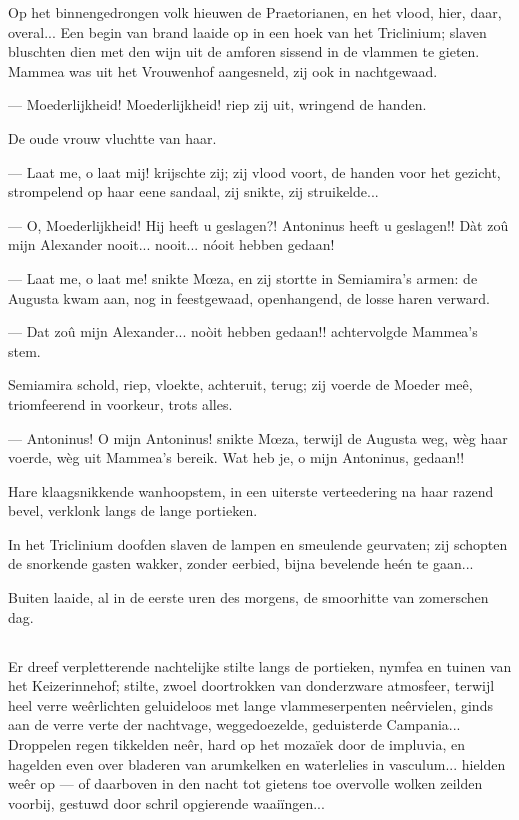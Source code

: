 \documentclass[a4paper, 12pt, oneside, dutch]{article}
\begin{document}
Op het binnengedrongen volk hieuwen de Praetorianen, en het vlood, hier, daar, overal... Een begin van brand laaide op in een hoek van het Triclinium; slaven bluschten dien met den wijn uit de amforen sissend in de vlammen te gieten. Mammea was uit het Vrouwenhof aangesneld, zij ook in nachtgewaad.

--- Moederlijkheid! Moederlijkheid! riep zij uit, wringend de handen.

De oude vrouw vluchtte van haar.

--- Laat me, o laat mij! krijschte zij; zij vlood voort, de handen voor het gezicht, strompelend op haar eene sandaal, zij snikte, zij struikelde...

--- O, Moederlijkheid! Hij heeft u geslagen?! Antoninus heeft u geslagen!! Dàt zoû mijn Alexander nooit... nooit... nóoit hebben gedaan!

--- Laat me, o laat me! snikte Mœza, en zij stortte in Semiamira's armen: de Augusta kwam aan, nog in feestgewaad, openhangend, de losse haren verward.

--- Dat zoû mijn Alexander... noòit hebben gedaan!! achtervolgde Mammea's stem.

Semiamira schold, riep, vloekte, achteruit, terug; zij voerde de Moeder meê, triomfeerend in voorkeur, trots alles.

--- Antoninus! O mijn Antoninus! snikte Mœza, terwijl de Augusta weg, wèg haar voerde, wèg uit Mammea's bereik. Wat heb je, o mijn Antoninus, gedaan!!

Hare klaagsnikkende wanhoopstem, in een uiterste verteedering na haar razend bevel, verklonk langs de lange portieken.

In het Triclinium doofden slaven de lampen en smeulende geurvaten; zij schopten de snorkende gasten wakker, zonder eerbied, bijna bevelende heén te gaan...

Buiten laaide, al in de eerste uren des morgens, de smoorhitte van zomerschen dag.

\subsection{}
\paragraph{}
Er dreef verpletterende nachtelijke stilte langs de portieken, nymfea en tuinen van het Keizerinnehof; stilte, zwoel doortrokken van donderzware atmosfeer, terwijl heel verre weêrlichten geluideloos met lange vlammeserpenten neêrvielen, ginds aan de verre verte der nachtvage, weggedoezelde, geduisterde Campania... Droppelen regen tikkelden neêr, hard op het mozaïek door de impluvia, en hagelden even over bladeren van arumkelken en waterlelies in vasculum... hielden weêr op --- of daarboven in den nacht tot gietens toe overvolle wolken zeilden voorbij, gestuwd door schril opgierende waaiïngen...
\end{document}
